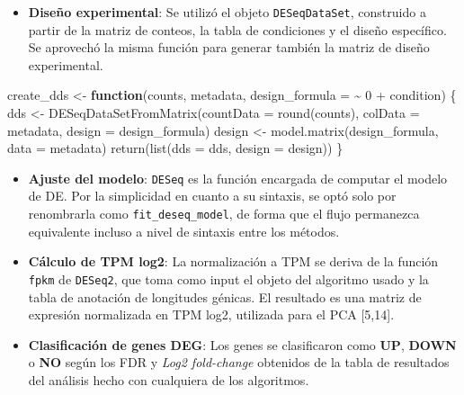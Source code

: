 \documentclass[
  12pt,
  letterpaper,
  DIV=11,
  numbers=noendperiod]{scrartcl}
\newenvironment{Shaded}{\begin{snugshade}}{\end{snugshade}}
\newcommand{\AttributeTok}[1]{\textcolor[rgb]{0.40,0.45,0.13}{#1}}
\newcommand{\ControlFlowTok}[1]{\textcolor[rgb]{0.00,0.23,0.31}{\textbf{#1}}}
\newcommand{\DecValTok}[1]{\textcolor[rgb]{0.68,0.00,0.00}{#1}}
\newcommand{\FunctionTok}[1]{\textcolor[rgb]{0.28,0.35,0.67}{#1}}
\newcommand{\NormalTok}[1]{\textcolor[rgb]{0.00,0.23,0.31}{#1}}
\newcommand{\OtherTok}[1]{\textcolor[rgb]{0.00,0.23,0.31}{#1}}
\newcommand{\SpecialCharTok}[1]{\textcolor[rgb]{0.37,0.37,0.37}{#1}}
\providecommand{\tightlist}{%
  \setlength{\itemsep}{0pt}\setlength{\parskip}{0pt}}
\begin{document}
\begin{itemize}
\tightlist
\item
  \textbf{Diseño experimental}: Se utilizó el objeto
  \texttt{DESeqDataSet}, construido a partir de la matriz de conteos, la
  tabla de condiciones y el diseño específico. Se aprovechó la misma
  función para generar también la matriz de diseño experimental.
\end{itemize}

\begin{Shaded}
\begin{Highlighting}[]
\NormalTok{create\_dds }\OtherTok{\textless{}{-}} \ControlFlowTok{function}\NormalTok{(counts, metadata, }\AttributeTok{design\_formula =} \SpecialCharTok{\textasciitilde{}} \DecValTok{0} \SpecialCharTok{+}\NormalTok{ condition) \{}
\NormalTok{  dds }\OtherTok{\textless{}{-}} \FunctionTok{DESeqDataSetFromMatrix}\NormalTok{(}\AttributeTok{countData =} \FunctionTok{round}\NormalTok{(counts), }\AttributeTok{colData =}\NormalTok{ metadata, }\AttributeTok{design =}\NormalTok{ design\_formula)}
\NormalTok{  design }\OtherTok{\textless{}{-}} \FunctionTok{model.matrix}\NormalTok{(design\_formula, }\AttributeTok{data =}\NormalTok{ metadata)}
  \FunctionTok{return}\NormalTok{(}\FunctionTok{list}\NormalTok{(}\AttributeTok{dds =}\NormalTok{ dds, }\AttributeTok{design =}\NormalTok{ design))}
\NormalTok{\}}
\end{Highlighting}
\end{Shaded}

\begin{itemize}
\item
  \textbf{Ajuste del modelo}: \texttt{DESeq} es la función encargada de
  computar el modelo de DE. Por la simplicidad en cuanto a su sintaxis,
  se optó solo por renombrarla como \texttt{fit\_deseq\_model}, de forma
  que el flujo permanezca equivalente incluso a nivel de sintaxis entre
  los métodos.
\item
  \textbf{Cálculo de TPM log2}: La normalización a TPM se deriva de la
  función \texttt{fpkm} de \texttt{DESeq2}, que toma como input el
  objeto del algoritmo usado y la tabla de anotación de longitudes
  génicas. El resultado es una matriz de expresión normalizada en TPM
  log2, utilizada para el PCA {[}5,14{]}.
\item
  \textbf{Clasificación de genes DEG}: Los genes se clasificaron como
  \textbf{UP}, \textbf{DOWN} o \textbf{NO} según los FDR y \emph{Log2
  fold-change} obtenidos de la tabla de resultados del análisis hecho
  con cualquiera de los algoritmos.
\end{itemize}
\end{document}
